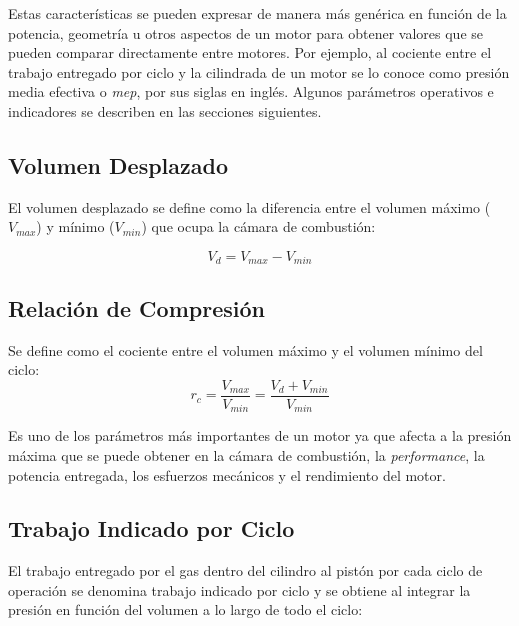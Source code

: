Estas características se pueden expresar de manera más genérica en función de la
potencia, geometría u otros aspectos de un motor para obtener valores que se
pueden comparar directamente entre motores.
%
Por ejemplo, al cociente entre el trabajo entregado por ciclo y la cilindrada
de un motor se lo conoce como presión media efectiva o \emph{mep}, por sus
siglas en inglés.
%
Algunos parámetros operativos e indicadores se describen en las secciones
siguientes.


\subsection{Volumen Desplazado}
%
El volumen desplazado se define como la diferencia entre el volumen máximo
($V_{max}$) y mínimo ($V_{min}$) que ocupa la cámara de combustión:

\begin{equation}\label{eq:vol_desp} V_d = V_{max}-V_{min}
\end{equation}
%


\subsection{Relación de Compresión}

Se define como el cociente entre el volumen máximo y el volumen mínimo del ciclo:
%
\begin{equation}\label{eq:rel_comp}
  r_c = \frac{V_{max}}{V_{min}} = \frac{V_d+V_{min}}{V_{min}}
\end{equation}

%
Es uno de los parámetros más importantes de un motor ya que afecta a la presión
máxima que se puede obtener en la cámara de combustión, la \emph{performance},
la potencia entregada, los esfuerzos mecánicos y el rendimiento del motor.


\subsection{Trabajo Indicado por Ciclo}
%
El trabajo entregado por el gas dentro del cilindro al pistón por cada ciclo de
operación se denomina trabajo indicado por ciclo y se obtiene al integrar la
presión en función del volumen a lo largo de todo el ciclo:

